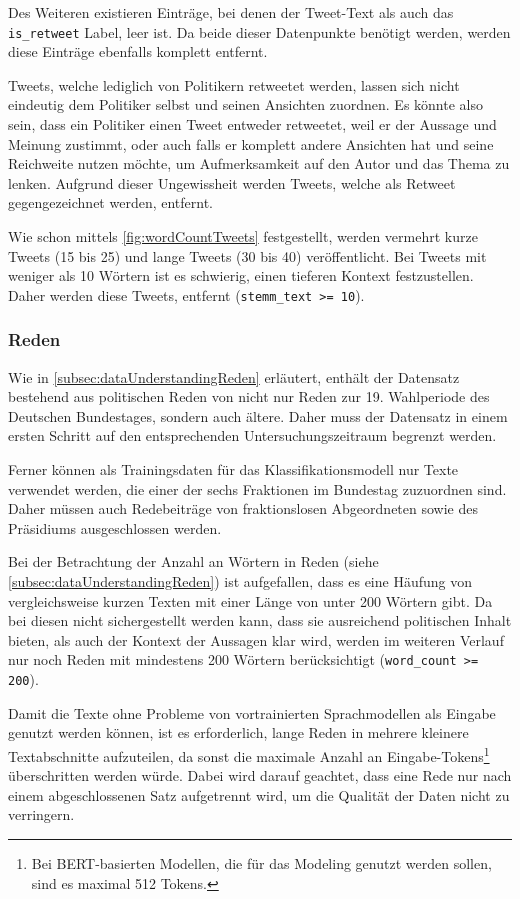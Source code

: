 Des Weiteren existieren Einträge, bei denen der Tweet-Text als auch das \texttt{is\_retweet} Label, leer ist. Da beide dieser Datenpunkte benötigt werden, werden diese Einträge ebenfalls komplett entfernt. 

Tweets, welche lediglich von Politikern retweetet werden, lassen sich nicht eindeutig dem Politiker selbst und seinen Ansichten zuordnen. Es könnte also sein, dass ein Politiker einen Tweet entweder retweetet, weil er der Aussage und Meinung zustimmt, oder auch falls er komplett andere Ansichten hat und seine Reichweite nutzen möchte, um Aufmerksamkeit auf den Autor und das Thema zu lenken. Aufgrund dieser Ungewissheit werden Tweets, welche als Retweet gegengezeichnet werden, entfernt.

Wie schon mittels \autoref{fig:wordCountTweets} festgestellt, werden vermehrt kurze Tweets (\num{15} bis \num{25}) und lange Tweets (\num{30} bis \num{40}) veröffentlicht. Bei Tweets mit weniger als \num{10} Wörtern ist es schwierig, einen tieferen Kontext festzustellen. Daher werden diese Tweets, entfernt (\texttt{stemm\_text >= 10}).

\subsubsection*{Reden}

Wie in \autoref{subsec:dataUnderstandingReden} erläutert, enthält der Datensatz bestehend aus politischen Reden von \citeauthor{richter_open_2021} nicht nur Reden zur 19. Wahlperiode des Deutschen Bundestages, sondern auch ältere. Daher muss der Datensatz in einem ersten Schritt auf den entsprechenden Untersuchungszeitraum begrenzt werden.

Ferner können als Trainingsdaten für das Klassifikationsmodell nur Texte verwendet werden, die einer der sechs Fraktionen im Bundestag zuzuordnen sind. Daher müssen auch Redebeiträge von fraktionslosen Abgeordneten sowie des Präsidiums ausgeschlossen werden.

Bei der Betrachtung der Anzahl an Wörtern in Reden (siehe \autoref{subsec:dataUnderstandingReden}) ist aufgefallen, dass es eine Häufung von vergleichsweise kurzen Texten mit einer Länge von unter \num{200} Wörtern gibt. Da bei diesen nicht sichergestellt werden kann, dass sie ausreichend politischen Inhalt bieten, als auch der Kontext der Aussagen klar wird, werden im weiteren Verlauf nur noch Reden mit mindestens 200 Wörtern berücksichtigt (\texttt{word\_count >= 200}).

Damit die Texte ohne Probleme von vortrainierten Sprachmodellen als Eingabe genutzt werden können, ist es erforderlich, lange Reden in mehrere kleinere Textabschnitte aufzuteilen, da sonst die maximale Anzahl an Eingabe-Tokens\footnote{Bei BERT-basierten Modellen, die für das Modeling genutzt werden sollen, sind es maximal 512 Tokens.} überschritten werden würde. Dabei wird darauf geachtet, dass eine Rede nur nach einem abgeschlossenen Satz aufgetrennt wird, um die Qualität der Daten nicht zu verringern.

